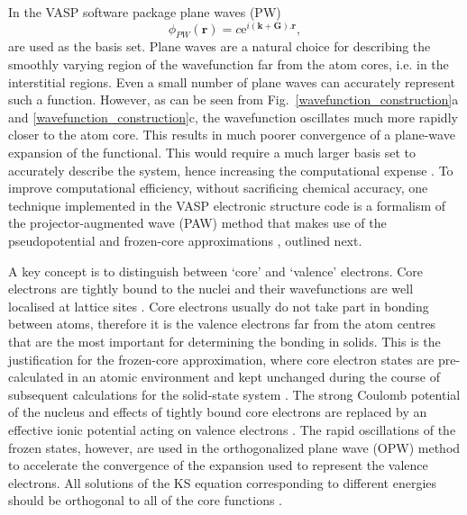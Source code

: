 \documentclass[11pt, twoside]{report}
\begin{document}
In the VASP software package \cite{VASP} plane waves (PW)
\begin{equation}\label{vasp_basis_set}
\phi_{PW}(\boldsymbol{r}) = c\mathrm{e}^{i(\boldsymbol{k}+\boldsymbol{G}).\boldsymbol{r}},
\end{equation}
are used as the basis set. 
Plane waves are a natural choice for describing the smoothly varying region of the wavefunction far from the atom cores, i.e. in the interstitial regions. Even a small number of plane waves can accurately represent such a function. However, as can be seen from Fig.~\ref{wavefunction_construction}a and \ref{wavefunction_construction}c, the wavefunction oscillates much more rapidly closer to the atom core. This results in much poorer convergence of a plane-wave expansion of the functional. This would require a much larger basis set to accurately describe the system, hence increasing the computational expense \cite{Prasad_ch5}. To improve computational efficiency, without sacrificing chemical accuracy, one technique implemented in the VASP electronic structure code is a formalism of the projector-augmented wave (PAW) method \cite{PAW} that makes use of the pseudopotential and frozen-core approximations \cite{PAW_VASP}, outlined next.

A key concept is to distinguish between `core' and `valence' electrons. Core electrons are tightly bound to the nuclei and their wavefunctions are well localised at lattice sites \cite{Prasad_ch5}. Core electrons usually do not take part in bonding between atoms, therefore it is the valence electrons far from the atom centres that are the most important for determining the bonding in solids. This is the justification for the frozen-core approximation, where core electron states are pre-calculated in an atomic environment and kept unchanged during the course of subsequent calculations for the solid-state system \cite{vasp_slides_PP1}. The strong Coulomb potential of the nucleus and effects of tightly bound core electrons are replaced by an effective ionic potential acting on valence electrons \cite{RichardMartin_Ch11}. The rapid oscillations of the frozen states, however, are used in the orthogonalized plane wave (OPW) method to accelerate the convergence of the expansion used to represent the valence electrons. All solutions of the KS equation corresponding to different energies should be orthogonal to all of the core functions \cite{Prasad_ch5}.
\end{document}
